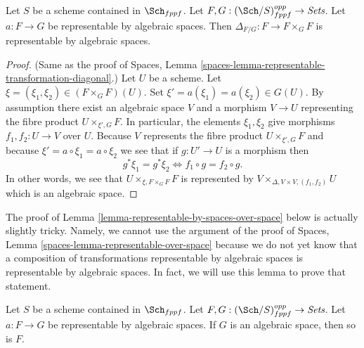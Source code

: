 \begin{lemma}
\label{lemma-representable-by-spaces-transformation-diagonal}
Let $S$ be a scheme contained in $\Sch_{fppf}$.
Let $F, G : (\Sch/S)_{fppf}^{opp} \to \textit{Sets}$.
Let $a : F \to G$ be representable by algebraic spaces.
Then $\Delta_{F/G} : F \to F \times_G F$ is representable by
algebraic spaces.
\end{lemma}

\begin{proof}
(Same as the proof of
Spaces, Lemma \ref{spaces-lemma-representable-transformation-diagonal}.)
Let $U$ be a scheme. Let $\xi = (\xi_1, \xi_2) \in (F \times_G F)(U)$.
Set $\xi' = a(\xi_1) = a(\xi_2) \in G(U)$.
By assumption there exist an algebraic space $V$ and a morphism $V \to U$
representing the fibre product $U \times_{\xi', G} F$.
In particular, the elements $\xi_1, \xi_2$ give morphisms
$f_1, f_2 : U \to V$ over $U$. Because $V$ represents the
fibre product $U \times_{\xi', G} F$ and because
$\xi' = a \circ \xi_1 = a \circ \xi_2$
we see that if $g : U' \to U$ is a morphism then
$$
g^*\xi_1 = g^*\xi_2
\Leftrightarrow
f_1 \circ g = f_2 \circ g.
$$
In other words, we see that $U \times_{\xi, F \times_G F} F$
is represented by $V \times_{\Delta, V \times V, (f_1, f_2)} U$
which is an algebraic space.
\end{proof}

\noindent
The proof of
Lemma \ref{lemma-representable-by-spaces-over-space}
below is actually slightly tricky. Namely,
we cannot use the argument of the proof of
Spaces, Lemma \ref{spaces-lemma-representable-over-space}
because we do not yet know that a composition of transformations
representable by algebraic spaces is representable by algebraic
spaces. In fact, we will use this lemma to prove that statement.

\begin{lemma}
\label{lemma-representable-by-spaces-over-space}
Let $S$ be a scheme contained in $\Sch_{fppf}$.
Let $F, G : (\Sch/S)_{fppf}^{opp} \to \textit{Sets}$.
Let $a : F \to G$ be representable by algebraic spaces.
If $G$ is an algebraic space, then so is $F$.
\end{lemma}

